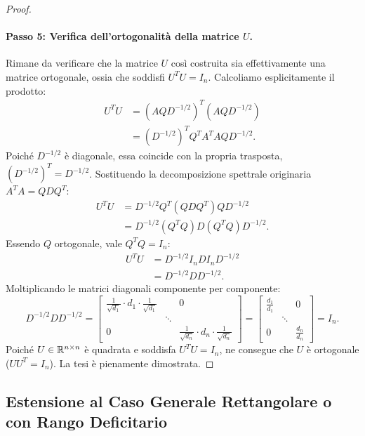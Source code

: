 \begin{proof}
\paragraph{Passo 5: Verifica dell'ortogonalit\`a della matrice $U$.}
Rimane da verificare che la matrice $U$ cos\`i costruita sia effettivamente una matrice ortogonale, ossia che soddisfi $U^T U = I_n$.
Calcoliamo esplicitamente il prodotto:
\begin{align}
    U^T U &= \left( A Q D^{-1/2} \right)^T \left( A Q D^{-1/2} \right) \nonumber \\
          &= \left( D^{-1/2} \right)^T Q^T A^T A Q D^{-1/2}.
\end{align}
Poich\'e $D^{-1/2}$ \`e diagonale, essa coincide con la propria trasposta, $(D^{-1/2})^T = D^{-1/2}$. Sostituendo la decomposizione spettrale originaria $A^T A = Q D Q^T$:
\begin{align}
    U^T U &= D^{-1/2} Q^T (Q D Q^T) Q D^{-1/2} \nonumber \\
          &= D^{-1/2} (Q^T Q) D (Q^T Q) D^{-1/2}.
\end{align}
Essendo $Q$ ortogonale, vale $Q^T Q = I_n$:
\begin{align}
    U^T U &= D^{-1/2} I_n D I_n D^{-1/2} \nonumber \\
          &= D^{-1/2} D D^{-1/2}.
\end{align}
Moltiplicando le matrici diagonali componente per componente:
\begin{equation}
    D^{-1/2} D D^{-1/2} = \begin{bmatrix}
        \frac{1}{\sqrt{d_1}} \cdot d_1 \cdot \frac{1}{\sqrt{d_1}} & & 0 \\
        & \ddots & \\
        0 & & \frac{1}{\sqrt{d_n}} \cdot d_n \cdot \frac{1}{\sqrt{d_n}}
    \end{bmatrix} = \begin{bmatrix}
        \frac{d_1}{d_1} & & 0 \\
        & \ddots & \\
        0 & & \frac{d_n}{d_n}
    \end{bmatrix} = I_n.
\end{equation}
Poich\'e $U \in \mathbb{R}^{n \times n}$ \`e quadrata e soddisfa $U^T U = I_n$, ne consegue che $U$ \`e ortogonale ($U U^T = I_n$). La tesi \`e pienamente dimostrata.
\end{proof}

\subsection{Estensione al Caso Generale Rettangolare o con Rango Deficitario}

